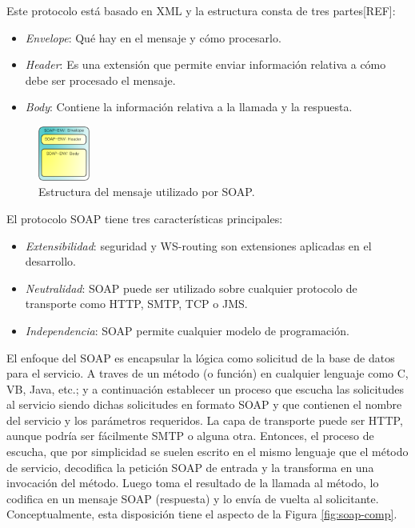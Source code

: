 \documentclass[conference]{IEEEtran}
\begin{document}
Este protocolo está basado en XML y la estructura consta de tres
partes[REF]:
\begin{itemize}
\item\emph{Envelope}: Qué hay en el mensaje y cómo procesarlo.
\item\emph{Header}: Es una extensión que permite enviar información
  relativa a cómo debe ser procesado el mensaje.
\item\emph{Body}: Contiene la información relativa a la llamada y la
  respuesta.
\end{itemize}

\begin{figure}[!t]
\centering
  \includegraphics[width=0.15\textwidth]{img/soap}
  \caption{Estructura del mensaje utilizado por SOAP.}
  \label{fig:soap-env}
\end{figure}

El protocolo SOAP tiene tres características principales:
\begin{itemize}
\item\emph{Extensibilidad}: seguridad y WS-routing son extensiones aplicadas
  en el desarrollo.
\item\emph{Neutralidad}: SOAP puede ser utilizado sobre cualquier protocolo
  de transporte como HTTP, SMTP, TCP o JMS.
\item\emph{Independencia}: SOAP permite cualquier modelo de programación.
\end{itemize}

El enfoque del SOAP\cite{SOA4} es encapsular la lógica como solicitud
de la base
de datos para el servicio. A traves de un método (o función) en
cualquier lenguaje como C, VB, Java, etc.; y a continuación establecer
un proceso que escucha las
solicitudes al servicio siendo dichas solicitudes en formato SOAP y
que contienen el nombre del servicio y los parámetros requeridos. La
capa de transporte puede ser HTTP, aunque podría ser fácilmente SMTP o
alguna otra. Entonces, el proceso de escucha, que por simplicidad se
suelen escrito en el mismo lenguaje que el método de servicio,
decodifica la petición SOAP de entrada y la transforma en una
invocación del método.
Luego toma el resultado de la llamada al método, lo codifica en un
mensaje SOAP (respuesta) y lo envía de vuelta al
solicitante. Conceptualmente, esta disposición tiene el aspecto de la
Figura \ref{fig:soap-comp}.
\end{document}
